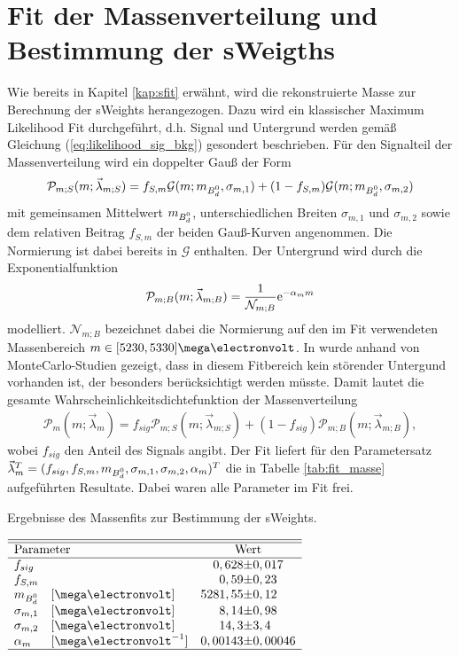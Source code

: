\section{Fit der Massenverteilung und Bestimmung der sWeigths} \label{kap:massenfit}
Wie bereits in Kapitel \ref{kap:sfit} erwähnt, wird die rekonstruierte Masse zur Berechnung der sWeights herangezogen. Dazu wird ein klassischer Maximum Likelihood Fit durchgeführt, d.h. Signal und Untergrund werden gemäß Gleichung (\ref{eq:likelihood_sig_bkg}) gesondert beschrieben. Für den Signalteil der Massenverteilung wird ein doppelter Gauß der Form
\begin{align}
\mathcal{P}_{m;S}(m;\vec{\lambda}_{m;S}) = f_{S,m}\mathcal{G}(m;m_{\text{$B_d^0$}},\sigma_{m,1}) + (1-f_{S,m})\mathcal{G}(m;m_{\text{$B_d^0$}},\sigma_{m,2})
\end{align}
mit gemeinsamen Mittelwert $m_{\text{$B_d^0$}}$, unterschiedlichen Breiten $\sigma_{m,1}$ und $\sigma_{m,2}$ sowie dem relativen Beitrag $f_{S,m}$ der beiden Gauß-Kurven angenommen. Die Normierung ist dabei bereits in $\mathcal{G}$ enthalten. Der Untergrund wird durch die Exponentialfunktion
\begin{align}
\mathcal{P}_{m;B}(m;\vec{\lambda}_{m;B}) = \frac{1}{\mathcal{N}_{m;B}}\mathrm{e}^{-\alpha_m m}
\end{align}
modelliert. $\mathcal{N}_{m;B}$ bezeichnet dabei die Normierung auf den im Fit verwendeten Massenbereich $m \in [5230,5330]\mega\electronvolt$. In \cite{lhcb-paper} wurde anhand von MonteCarlo-Studien gezeigt, dass in diesem Fitbereich kein störender Untergund vorhanden ist, der besonders berücksichtigt werden müsste. Damit lautet die gesamte Wahrscheinlichkeitsdichtefunktion der Massenverteilung
\begin{align}
\mathcal{P}_{m}(m;\vec{\lambda}_{m}) = f_{sig}\mathcal{P}_{m;S}(m;\vec{\lambda}_{m;S}) + (1-f_{sig})\mathcal{P}_{m;B}(m;\vec{\lambda}_{m;B}) \label{eq:pdf_masse},
\end{align}
wobei $f_{sig}$ den Anteil des Signals angibt. Der Fit liefert für den Parametersatz $\vec{\lambda}_{m}^T = (f_{sig}, f_{S,m}, m_{\text{$B_d^0$}}, \sigma_{m,1},\sigma_{m,2}, \alpha_m)^T$ die in Tabelle \ref{tab:fit_masse} aufgeführten Resultate. Dabei waren alle Parameter im Fit frei. 
\begin{table}[hptb]
\centering
\caption{Ergebnisse des Massenfits zur Bestimmung der sWeights.}
\label{tab:fit_masse}
$\begin{array}{llr@{\pm}l}
\hline \hline
\multicolumn{2}{l}{\text{Parameter}} & \multicolumn{2}{c}{\text{Wert}}\\ \hline
f_{sig} &  & 0,628 & 0,017\\
f_{S,m} &  & 0,59 & 0,23 \\
m_{\text{\Bd}} & [\mega\electronvolt]& 5281,55 & 0,12\\
\sigma_{m,1} & [\mega\electronvolt]  & 8,14 & 0,98\\
\sigma_{m,2} &[\mega\electronvolt] & 14,3 & 3,4  \\
\alpha_m &[\mega\electronvolt^{-1}]& 0,00143 & 0,00046  \\ \hline
\end{array}$
\end{table}

